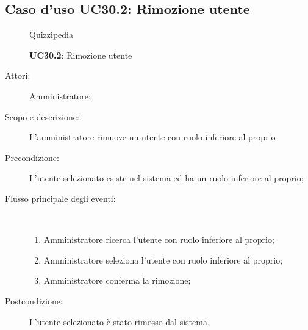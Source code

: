 \subsection{Caso d'uso UC30.2: Rimozione utente}
	\begin{figure}[H]
		\centering
		\begin{resizedtikzpicture}{\textwidth}
		\begin{umlsystem}[x=0, fill=lightgray!20]{Quizzipedia}
		\end{umlsystem}
		\end{resizedtikzpicture}
		\caption{\textbf{UC30.2}: Rimozione utente}
		\label{UC30.2}
	\end{figure}
\begin{description}
\item[Attori:] Amministratore;
\item[Scopo e descrizione:] L'amministratore rimuove un utente con ruolo inferiore al proprio
      \item[Precondizione:] L'utente selezionato esiste nel sistema ed ha un ruolo inferiore al proprio;

        \item[Flusso principale degli eventi:] \ 
 \begin{enumerate}
          \item Amministratore ricerca l'utente con ruolo inferiore al proprio;
          \item Amministratore seleziona l'utente con ruolo inferiore al proprio;
          \item Amministratore conferma la rimozione;

      \end{enumerate}
    \item[Postcondizione:] L'utente selezionato è stato rimosso dal sistema.
  \end{description}
\hypertarget{UC31}{}
